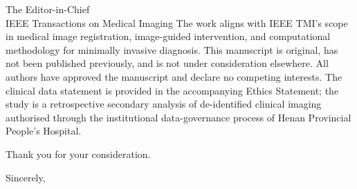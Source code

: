 \documentclass[10pt]{letter}
\begin{document}
\begin{letter}{The Editor-in-Chief\\IEEE Transactions on Medical Imaging}
The work aligns with IEEE TMI's scope in medical image registration,
image-guided intervention, and computational methodology for minimally invasive
diagnosis. This manuscript is original, has not been published previously, and
is not under consideration elsewhere. All authors have approved the manuscript
and declare no competing interests. The clinical data statement is provided in
the accompanying Ethics Statement; the study is a retrospective secondary
analysis of de-identified clinical imaging authorised through the institutional
data-governance process of Henan Provincial People's Hospital.

Thank you for your consideration.

\closing{Sincerely,}
\end{letter}
\end{document}
